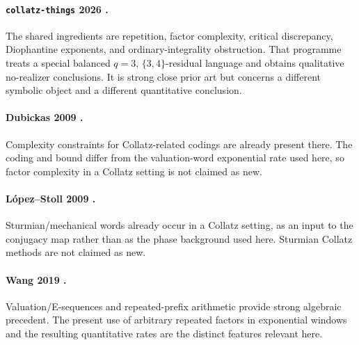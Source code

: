 \documentclass[11pt]{amsart}
\begin{document}
\paragraph{\texttt{collatz-things} 2026 \cite{CollatzThings2026}.}
The shared ingredients are repetition, factor complexity, critical discrepancy, Diophantine exponents, and ordinary-integrality obstruction.  That programme treats a special balanced \(q=3\), \(\{3,4\}\)-residual language and obtains qualitative no-realizer conclusions.  It is strong close prior art but concerns a different symbolic object and a different quantitative conclusion.

\paragraph{Dubickas 2009 \cite{Dubickas2009}.}
Complexity constraints for Collatz-related codings are already present there.  The coding and bound differ from the valuation-word exponential rate used here, so factor complexity in a Collatz setting is not claimed as new.

\paragraph{L\'opez--Stoll 2009 \cite{LopezStoll2009}.}
Sturmian/mechanical words already occur in a Collatz setting, as an input to the conjugacy map rather than as the phase background used here.  Sturmian Collatz methods are not claimed as new.

\paragraph{Wang 2019 \cite{Wang2019}.}
Valuation/E-sequences and repeated-prefix arithmetic provide strong algebraic precedent.  The present use of arbitrary repeated factors in exponential windows and the resulting quantitative rates are the distinct features relevant here.



\end{document}

